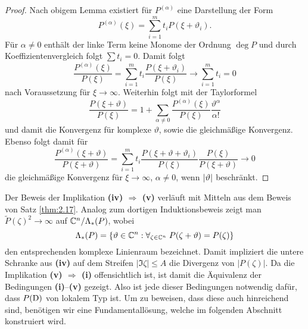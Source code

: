 \begin{proof}
Nach obigem Lemma existiert für $P^{(\alpha)}$ eine Darstellung der Form
\begin{equation}
P^{(\alpha)}(\xi)=\sum_{i=1}^m t_i P(\xi+\vartheta_i).
\end{equation}
Für $\alpha\neq0$ enthält der linke Term keine Monome der Ordnung $\deg P$ und durch Koeffizientenvergleich folgt $\sum t_i=0$. Damit folgt
\begin{equation}
\dfrac{P^{(\alpha)}(\xi)}{P(\xi)}=\sum_{i=1}^m t_i\dfrac{P(\xi+\vartheta_i)}{P(\xi)} \rightarrow \sum_{i=1}^m t_i=0
\end{equation}
nach Voraussetzung für $\xi\to\infty$. Weiterhin folgt mit der Taylorformel
\begin{equation}
\dfrac{P(\xi+\vartheta)}{P(\xi)}=1+\sum_{\alpha\neq 0} \dfrac{P^{(\alpha)}(\xi)}{P(\xi)}\dfrac{\vartheta^\alpha}{\alpha!}
\end{equation}
und damit die Konvergenz für komplexe $\vartheta$, sowie die gleichmäßige Konvergenz. Ebenso folgt damit für
\begin{equation}
\dfrac{P^{(\alpha)}(\xi+\vartheta)}{P(\xi+\vartheta)}=\sum_{i=1}^mt_i\dfrac{P(\xi+\vartheta+\vartheta_i)}{P(\xi)}\dfrac{P(\xi)}{P(\xi+\vartheta)} \rightarrow 0
\end{equation}
die gleichmäßige Konvergenz für $\xi\to\infty$, $\alpha\neq0$, wenn $\lvert\vartheta\rvert$ beschränkt.
\end{proof}
Der Beweis der Implikation {\bf (iv) $\Rightarrow$ (v)} verläuft mit Mitteln aus dem Beweis von Satz \ref{thm:2.17}. Analog zum dortigen Induktionsbeweis zeigt man $\widetilde P(\zeta)^2\to\infty$ auf $\mathbb C^n / \Lambda_*(P)$,  wobei 
\begin{equation}
\Lambda_*(P)=\{ \vartheta\in\mathbb C^n : \forall_{\zeta\in\mathbb C^n}\; P(\zeta+\vartheta)=P(\zeta)  \}
\end{equation} 
den entsprechenden komplexe Linienraum bezeichnet. Damit impliziert die untere Schranke aus {\bf (iv)} auf dem Streifen $|\Im\zeta|\le A$ die Divergenz von $|P(\zeta)|$. Da die Implikation {\bf (v) $\Rightarrow$ (i)} offensichtlich ist, ist damit die Äquivalenz der Bedingungen {\bf (i)}--{\bf(v)} gezeigt. Also ist jede dieser Bedingungen notwendig dafür, dass $P(\mathrm D)$ von lokalem Typ ist. Um zu beweisen, dass diese auch hinreichend sind, benötigen wir eine Fundamentallösung, welche im folgenden Abschnitt konstruiert wird.

